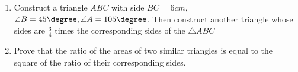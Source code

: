 \begin{enumerate}
\item Construct a triangle $ABC$ with side $BC = 6 cm$, $\angle B=45\degree, \angle A= 105\degree$. Then construct another triangle whose sides are $\frac{3}{4}$ times the corresponding sides of the $\triangle ABC$
\item Prove that the ratio of the areas of two similar triangles is equal to the square of the ratio of their corresponding sides. 
\end{enumerate}